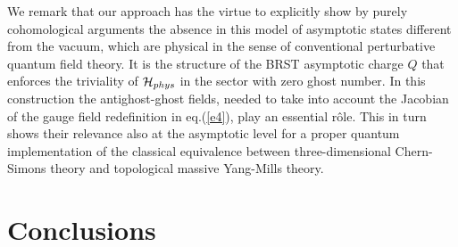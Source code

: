 \documentclass[a4paper,11pt]{article}
\begin{document}
We remark that our approach has the virtue to explicitly show
by purely cohomological arguments the 
absence in this model
of asymptotic states different from the vacuum, which
are physical in the sense of conventional perturbative
quantum field theory.
%
It is the structure of the BRST asymptotic charge $Q$ that enforces
the triviality of ${\cal H}_{phys}$ in the sector with zero ghost number.
In this construction the antighost-ghost fields, needed to take into
account the Jacobian of the gauge field redefinition in eq.(\ref{e4}),
play an essential r\^ole. This in turn  shows their relevance 
also at the asymptotic level for a proper 
quantum implementation of the classical equivalence between
three-dimensional Chern-Simons theory and
topological massive Yang-Mills theory.

\section{Conclusions}\label{sec7}
\end{document}
